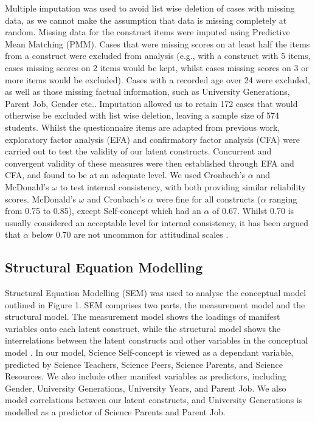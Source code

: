 Multiple imputation was used to avoid list wise deletion of cases with missing data, as we cannot make the assumption that data is missing completely at random. Missing data for the construct items were imputed using Predictive Mean Matching (PMM). Cases that were missing scores on at least half the items from a construct were excluded from analysis (e.g., with a construct with 5 items, cases missing scores on 2 items would be kept, whilst cases missing scores on 3 or more items would be excluded). Cases with a recorded age over 24 were excluded, as well as those missing factual information, such as University Generations, Parent Job, Gender etc.. Imputation allowed us to retain 172 cases that would otherwise be excluded with list wise deletion, leaving a  sample size of 574 students. Whilst the questionnaire items are adapted from previous work, exploratory factor analysis (EFA) and confirmatory factor analysis (CFA) were carried out to test the validity of our latent constructs. Concurrent and convergent validity \cite{campbell1959convergent} of these measures were then established through EFA and CFA, and found to be at an adequate level. We used Cronbach's $\alpha$ and McDonald's $\omega$ to test internal consistency, with both providing similar reliability scores. McDonald's $\omega$ and Cronbach's $\alpha$ were fine for all constructs ($\alpha$ ranging from 0.75 to 0.85), except Self-concept which had an $\alpha$ of 0.67. Whilst 0.70 is usually considered an acceptable level for internal consistency, it has been argued that $\alpha$ below 0.70 are not uncommon for attitudinal scales \cite{field2012discovering}. 

\subsection*{Structural Equation Modelling}
Structural Equation Modelling (SEM) was used to analyse the conceptual model outlined in Figure 1. SEM comprises two parts, the measurement model and the structural model. The measurement model shows the loadings of manifest variables onto each latent construct, while the structural model shows the interrelations between the latent constructs and other variables in the conceptual model \cite{schreiber2006reporting}. In our model, Science Self-concept is viewed as a dependant variable, predicted by Science Teachers, Science Peers, Science Parents, and Science Resources. We also include other manifest variables as predictors, including Gender, University Generations, University Years, and Parent Job. We also model correlations between our latent constructs, and University Generations is modelled as a predictor of Science Parents and Parent Job.

